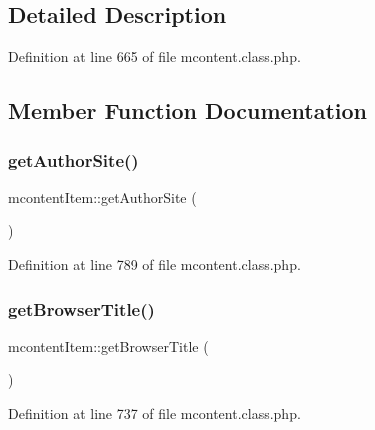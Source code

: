 \subsection{Detailed Description}


Definition at line 665 of file mcontent.\+class.\+php.



\subsection{Member Function Documentation}
\hypertarget{classmcontentItem_a90fc323e4d3cf2661e6af5e51babd05f}{}\label{classmcontentItem_a90fc323e4d3cf2661e6af5e51babd05f} 
\subsubsection{\texorpdfstring{get\+Author\+Site()}{getAuthorSite()}}
{\footnotesize\ttfamily mcontent\+Item\+::get\+Author\+Site (\begin{DoxyParamCaption}{ }\end{DoxyParamCaption})}



Definition at line 789 of file mcontent.\+class.\+php.

\hypertarget{classmcontentItem_a6fe964acc2f33039f90a6ed33ae03ba9}{}\label{classmcontentItem_a6fe964acc2f33039f90a6ed33ae03ba9} 
\subsubsection{\texorpdfstring{get\+Browser\+Title()}{getBrowserTitle()}}
{\footnotesize\ttfamily mcontent\+Item\+::get\+Browser\+Title (\begin{DoxyParamCaption}{ }\end{DoxyParamCaption})}



Definition at line 737 of file mcontent.\+class.\+php.

\hypertarget{classmcontentItem_ae8d1d6e76cc1cfa79d544d47acaedbcc}{}\label{classmcontentItem_ae8d1d6e76cc1cfa79d544d47acaedbcc} 
